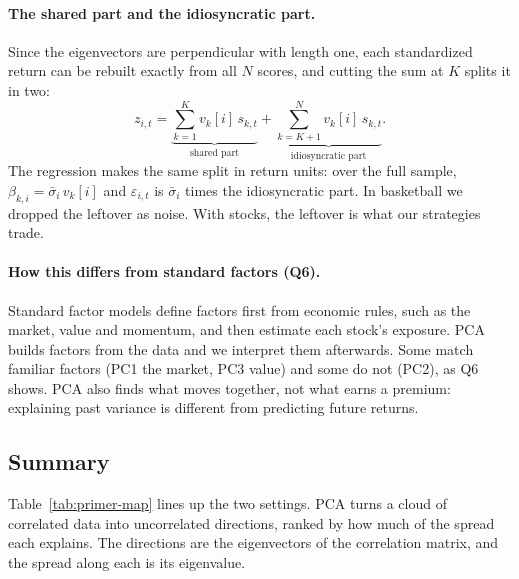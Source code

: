\documentclass[11pt,letterpaper]{article}
\begin{document}
\paragraph{The shared part and the idiosyncratic part.} Since the
eigenvectors are perpendicular with length one, each standardized return
can be rebuilt exactly from all $N$ scores, and cutting the sum at $K$
splits it in two:
\[
    z_{i,t}=
    \underbrace{\sum_{k=1}^{K} v_k[i]\,s_{k,t}}_{\text{shared part}}
    +\underbrace{\sum_{k=K+1}^{N} v_k[i]\,s_{k,t}}_{\text{idiosyncratic part}} .
\]
The regression makes the same split in return units: over the full
sample, $\beta_{k,i}=\bar\sigma_i\,v_k[i]$ and $\varepsilon_{i,t}$ is
$\bar\sigma_i$ times the idiosyncratic part. In basketball we dropped the
leftover as noise. With stocks, the leftover is what our strategies trade.

\paragraph{How this differs from standard factors (Q6).} Standard factor
models define factors first from economic rules, such as the market,
value and momentum, and then estimate each stock's exposure. PCA builds
factors from the data and we interpret them afterwards. Some match
familiar factors (PC1 the market, PC3 value) and some do not (PC2), as Q6
shows. PCA also finds what moves together, not what earns a premium:
explaining past variance is different from predicting future returns.

\subsection{Summary}
Table~\ref{tab:primer-map} lines up the two settings. PCA turns a cloud of
correlated data into uncorrelated directions, ranked by how much of the
spread each explains. The directions are the eigenvectors of the
correlation matrix, and the spread along each is its eigenvalue.
\end{document}
